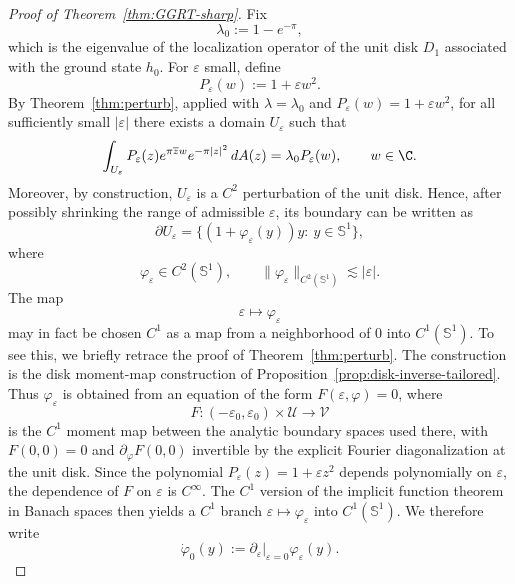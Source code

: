 \begin{proof}[Proof of Theorem~\ref{thm:GGRT-sharp}]
Fix
\[
\lambda_0:=1-e^{-\pi},
\]
which is the eigenvalue of the localization operator of the unit disk $D_1$
associated with the ground state $h_0$. For $\varepsilon$ small, define
\[
P_\varepsilon(w):=1+\varepsilon w^2.
\]
By Theorem~\ref{thm:perturb}, applied with \(\lambda=\lambda_0\) and
\(P_\varepsilon(w)=1+\varepsilon w^2\), for all sufficiently small
\(|\varepsilon|\) there exists a domain \(U_\varepsilon\) such that
\begin{equation}\label{eq:functiona-P-eps-new}
\int_{U_\varepsilon} P_\varepsilon(z)e^{\pi \overline zw}e^{-\pi|z|^2}\,dA(z)
=
\lambda_0 P_\varepsilon(w),
\qquad w\in\C.
\end{equation}
Moreover, by construction, $U_\varepsilon$ is a $C^2$ perturbation of the unit
disk. Hence, after possibly shrinking the range of admissible $\varepsilon$,
its boundary can be written as
\begin{equation}\label{eq:def-u-eps-new}
\partial U_\varepsilon
=
\{(1+\varphi_\varepsilon(y))y:\ y\in \mathbb S^1\},
\end{equation}
where
\[
\varphi_\varepsilon\in C^2(\mathbb S^1),
\qquad
\|\varphi_\varepsilon\|_{C^2(\mathbb S^1)}\lesssim |\varepsilon|.
\]
The map
\[
\varepsilon\mapsto \varphi_\varepsilon
\]
may in fact be chosen \(C^1\) as a map from a neighborhood of \(0\) into
\(C^1(\mathbb S^1)\). To see this, we briefly retrace the proof of
Theorem~\ref{thm:perturb}. The construction is the disk moment-map
construction of Proposition~\ref{prop:disk-inverse-tailored}. Thus
\(\varphi_\varepsilon\) is obtained from an equation of the form
\(F(\varepsilon,\varphi)=0\), where
\[
F:(-\varepsilon_0,\varepsilon_0)\times \mathcal U\to \mathcal V
\]
is the \(C^1\) moment map between the analytic boundary spaces used there,
with \(F(0,0)=0\) and \(\partial_\varphi F(0,0)\) invertible by the explicit
Fourier diagonalization at the unit disk. Since the polynomial
\(P_\varepsilon(z)=1+\varepsilon z^2\)
depends polynomially on \(\varepsilon\), the dependence of \(F\) on
\(\varepsilon\) is \(C^\infty\). The \(C^1\) version of the implicit function
theorem in Banach spaces then yields a \(C^1\) branch
\(\varepsilon\mapsto \varphi_\varepsilon\) into \(C^1(\mathbb S^1)\). We
therefore write
\[
\dot\varphi_0(y):=
\left.\partial_\varepsilon\right|_{\varepsilon=0}\varphi_\varepsilon(y).
\]


\end{proof}
